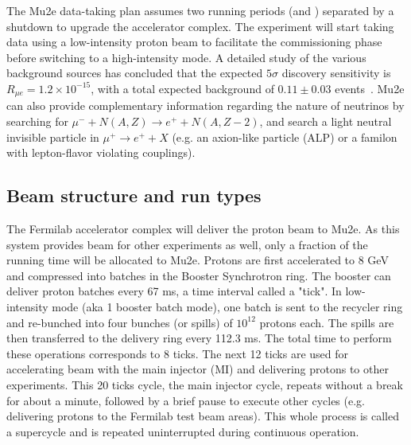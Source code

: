 The Mu2e data-taking plan assumes two running periods (\runone and \runtwo) separated by a shutdown to upgrade the accelerator complex. The experiment will start taking data using a low-intensity proton beam to facilitate the commissioning phase before switching to a high-intensity mode. A detailed study of the various background sources has concluded that the expected \runone $5\sigma$ discovery sensitivity is $R_{\mu e} =  1.2 \times 10^{-15}$, with a total expected background of $0.11 \pm 0.03$ events~\cite{Mu2e:2022ggl}. Mu2e can also provide complementary information regarding the nature of neutrinos by searching for $\mu^- + N(A,Z) \rightarrow e^+ + N(A,Z-2)$, and search a light neutral invisible particle in $\mu^+ \rightarrow e^+ + X$ (e.g. an axion-like particle (ALP) or a familon with lepton-flavor violating couplings).

\subsection {Beam structure and run types}
The Fermilab accelerator complex will deliver the proton beam to Mu2e. As this system provides beam for other experiments as well, only a fraction of the running time will be allocated to Mu2e. Protons are first accelerated to 8 GeV and compressed into batches in the Booster Synchrotron ring. The booster can deliver proton batches every 67 ms, a time interval called a "tick". In low-intensity mode (aka 1 booster batch mode), one batch is sent to the recycler ring and re-bunched into four bunches (or spills) of $10^{12}$ protons each. The spills are then transferred to the delivery ring every 112.3 ms. The total time to perform these operations corresponds to 8 ticks. The next 12 ticks are used for accelerating beam with the main injector (MI) and delivering protons to other experiments. This 20 ticks cycle, the main injector cycle, repeats without a break for about a minute, followed by a brief pause to execute other cycles (e.g. delivering protons to the Fermilab test beam areas). This whole process is called a supercycle and is repeated uninterrupted during continuous operation. 

